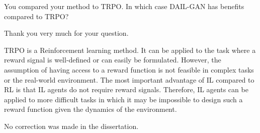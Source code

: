 \begin{revcomment}
  You compared your method to TRPO.
  In which case DAIL-GAN has benefits compared to TRPO?
\end{revcomment}
\begin{revresponse}
  Thank you very much for your question.

  TRPO is a Reinforcement learning method.
  It can be applied to the task where a reward signal is well-defined or can easily be formulated.
  However, the assumption of having access to a reward function is not feasible in complex tasks or the real-world environment.
  The most important advantage of IL compared to RL is that IL agents do not require reward signals.
  Therefore, IL agents can be applied to more difficult tasks in which it may be impossible to design such a reward function given the dynamics of the environment.

  \begin{correction}
    No correction was made in the dissertation.
  \end{correction}
\end{revresponse}




